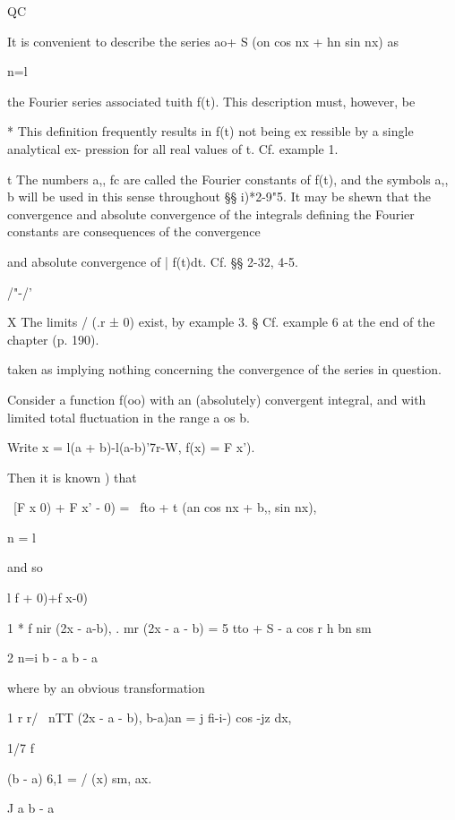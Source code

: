 QC

It is convenient to describe the series ao+ S (on cos nx + hn sin nx)
as

n=l

the Fourier series associated tuith f(t). This description must,
however, be

* This definition frequently results in f(t) not being ex ressible by
a single analytical ex- pression for all real values of t. Cf.
example 1.

t The numbers a,, fc are called the Fourier constants of f(t), and
the symbols a,, b will be used in this sense throughout §§ i)*2-9"5.
It may be shewn that the convergence and absolute convergence of the
integrals defining the Fourier constants are consequences of the
convergence

and absolute convergence of | f(t)dt. Cf. §§ 2-32, 4-5.

/"-/'

X The limits / (.r ± 0) exist, by example 3. § Cf. example 6 at
the end of the chapter (p. 190).

%
%

taken as implying nothing concerning the convergence of the series in
question.


Consider a function f(oo) with an (absolutely) convergent integral,
and with limited total fluctuation in the range a os b.

Write x = l(a + b)-l(a-b)'7r-W, f(x) = F x').

Then it is known ) that

\ [F x 0) + F x' - 0) = \ fto + t (an cos nx + b,, sin nx),

n = l

and so

l f + 0)+f x-0)

1 * f nir (2x - a-b), . mr (2x - a - b) = 5 tto + S - a cos r h bn sm

2 n=i b - a b - a

where by an obvious transformation

1 r r/ \ nTT (2x - a - b), b-a)an = j fi-i-) cos -jz dx,

1/7 \; f%

  (b - a) 6,1 = / (x) sm, ax.

  J a b - a

